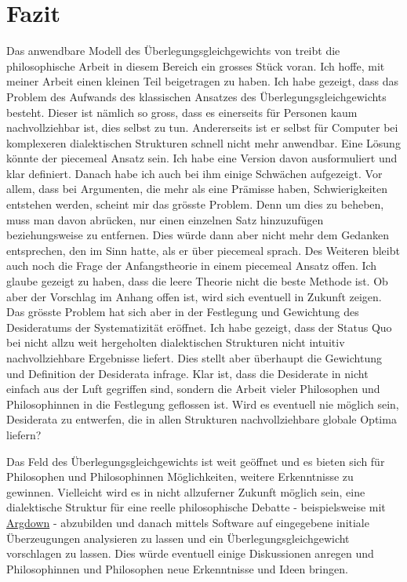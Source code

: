 \documentclass{article}
\begin{document}
\section{Fazit}
Das anwendbare Modell des Überlegungsgleichgewichts von \citeauthor{beisbart_making_2021} treibt die philosophische Arbeit in diesem Bereich ein grosses Stück voran. Ich hoffe, mit meiner Arbeit einen kleinen Teil beigetragen zu haben. Ich habe gezeigt, dass das Problem des Aufwands des klassischen Ansatzes des Überlegungsgleichgewichts besteht. Dieser ist nämlich so gross, dass es einerseits für Personen kaum nachvollziehbar ist, dies selbst zu tun. Andererseits ist er selbst für Computer bei komplexeren dialektischen Strukturen schnell nicht mehr anwendbar. Eine Lösung könnte der piecemeal Ansatz sein. Ich habe eine Version davon ausformuliert und klar definiert. Danach habe ich auch bei ihm einige Schwächen aufgezeigt. Vor allem, dass bei Argumenten, die mehr als eine Prämisse haben, Schwierigkeiten entstehen werden, scheint mir das grösste Problem. Denn um dies zu beheben, muss man davon abrücken, nur einen einzelnen Satz hinzuzufügen beziehungsweise zu entfernen. Dies würde dann aber nicht mehr dem Gedanken entsprechen, den \autocite{goodman_fact_1983} im Sinn hatte, als er über piecemeal sprach. Des Weiteren bleibt auch noch die Frage der Anfangstheorie in einem piecemeal Ansatz offen. Ich glaube gezeigt zu haben, dass die leere Theorie nicht die beste Methode ist. Ob aber der Vorschlag im Anhang offen ist, wird sich eventuell in Zukunft zeigen.
Das grösste Problem hat sich aber in der Festlegung und Gewichtung des Desideratums der Systematizität eröffnet. Ich habe gezeigt, dass der Status Quo bei nicht allzu weit hergeholten dialektischen Strukturen nicht intuitiv nachvollziehbare Ergebnisse liefert. Dies stellt aber überhaupt die Gewichtung und Definition der Desiderata infrage. Klar ist, dass die Desiderate in \autocite{beisbart_making_2021} nicht einfach aus der Luft gegriffen sind, sondern die Arbeit vieler Philosophen und Philosophinnen in die Festlegung geflossen ist. Wird es eventuell nie möglich sein, Desiderata zu entwerfen, die in allen Strukturen nachvollziehbare globale Optima liefern?

Das Feld des Überlegungsgleichgewichts ist weit geöffnet und es bieten sich für Philosophen und Philosophinnen Möglichkeiten, weitere Erkenntnisse zu gewinnen. Vielleicht wird es in nicht allzuferner Zukunft möglich sein, eine dialektische Struktur für eine reelle philosophische Debatte - beispielsweise mit \href{https://argdown.org/}{Argdown} - abzubilden und danach mittels Software auf eingegebene initiale Überzeugungen analysieren zu lassen und ein Überlegungsgleichgewicht vorschlagen zu lassen. Dies würde eventuell einige Diskussionen anregen und Philosophinnen und Philosophen neue Erkenntnisse und Ideen bringen.
\end{document}

